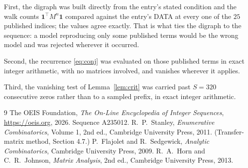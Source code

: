 \documentclass[11pt,a4paper]{article}
\theoremstyle{plain}
\theoremstyle{definition}
\begin{document}
First, the digraph was built directly from the entry's stated condition and the walk counts
$\mathbf{1}^{\!\top}M^{n}\mathbf{1}$ compared against the entry's DATA at every one of
the $25$ published indices; the values agree exactly. That is what ties the digraph to
the sequence: a model reproducing only some published terms would be the wrong model and
was rejected wherever it occurred.

Second, the recurrence \eqref{eq:conj} was evaluated on those published terms in exact
integer arithmetic, with no matrices involved, and vanishes wherever it applies.

Third, the vanishing test of Lemma~\ref{lem:crit} was carried past $S=320$ consecutive
zeros rather than to a sampled prefix, in exact integer arithmetic.

\begin{thebibliography}{9}
 The OEIS Foundation, \emph{The On-Line Encyclopedia of Integer
Sequences}, \url{https://oeis.org}, 2026. Sequence A235012.
 R.~P.~Stanley, \emph{Enumerative Combinatorics}, Volume 1, 2nd ed.,
Cambridge University Press, 2011. (Transfer-matrix method, Section 4.7.)
 P.~Flajolet and R.~Sedgewick, \emph{Analytic Combinatorics}, Cambridge
University Press, 2009.
 R.~A.~Horn and C.~R.~Johnson, \emph{Matrix Analysis}, 2nd ed., Cambridge
University Press, 2013.
\end{thebibliography}
\end{document}
